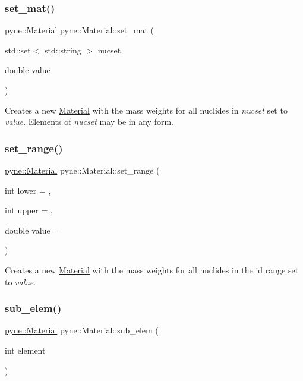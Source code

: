\subsubsection{\texorpdfstring{set\+\_\+mat()}{set\_mat()}\hspace{0.1cm}{\footnotesize\ttfamily [2/2]}}
{\footnotesize\ttfamily \hyperlink{classpyne_1_1_material}{pyne\+::\+Material} pyne\+::\+Material\+::set\+\_\+mat (\begin{DoxyParamCaption}\item[{std\+::set$<$ std\+::string $>$}]{nucset,  }\item[{double}]{value }\end{DoxyParamCaption})}

Creates a new \hyperlink{classpyne_1_1_material}{Material} with the mass weights for all nuclides in {\itshape nucset} set to {\itshape value}. Elements of {\itshape nucset} may be in any form. \mbox{\label{classpyne_1_1_material_af81eb0e8c7f65792bc699c4aec82bb7e}} 
\subsubsection{\texorpdfstring{set\+\_\+range()}{set\_range()}}
{\footnotesize\ttfamily \hyperlink{classpyne_1_1_material}{pyne\+::\+Material} pyne\+::\+Material\+::set\+\_\+range (\begin{DoxyParamCaption}\item[{int}]{lower = {},  }\item[{int}]{upper = {},  }\item[{double}]{value = {} }\end{DoxyParamCaption})}

Creates a new \hyperlink{classpyne_1_1_material}{Material} with the mass weights for all nuclides in the id range set to {\itshape value}. \mbox{\label{classpyne_1_1_material_aa38cb12439e08391849d41f803f03495}} 
\subsubsection{\texorpdfstring{sub\+\_\+elem()}{sub\_elem()}}
{\footnotesize\ttfamily \hyperlink{classpyne_1_1_material}{pyne\+::\+Material} pyne\+::\+Material\+::sub\+\_\+elem (\begin{DoxyParamCaption}\item[{int}]{element }\end{DoxyParamCaption})}

